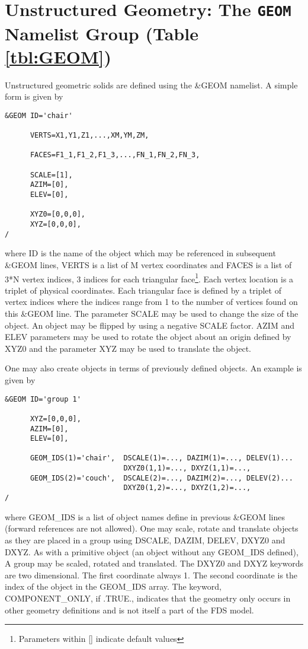 \documentclass[12pt]{article}
\begin{document}
\vspace{1.0in}
\section{Unstructured Geometry: The \texorpdfstring{{\tt GEOM}}{GEOM} Namelist Group (Table \ref{tbl:GEOM})}
\label{info:GEOM}

Unstructured geometric solids are defined using the \&GEOM namelist.
A simple form is given by

\begin{verbatim}
&GEOM ID='chair'

      VERTS=X1,Y1,Z1,...,XM,YM,ZM,

      FACES=F1_1,F1_2,F1_3,...,FN_1,FN_2,FN_3,

      SCALE=[1],
      AZIM=[0],
      ELEV=[0],

      XYZ0=[0,0,0],
      XYZ=[0,0,0],
/
\end{verbatim}

\noindent where ID is the name of the object which may be referenced in subsequent \&GEOM lines, VERTS is a list of M vertex coordinates and FACES is a list of 3*N vertex indices, 3 indices for each triangular face\footnote{Parameters within [] indicate default values}.  Each vertex location is a triplet of physical coordinates.  Each triangular face is defined by a triplet of vertex indices where the indices range from 1 to the number of vertices found on this \&GEOM line. The parameter SCALE may be used to change the size of the object. An object may be flipped by using a negative SCALE factor.  AZIM and ELEV parameters may be used to rotate the object about an origin defined by XYZ0 and the parameter XYZ may be used to translate the object.

One may also create objects in terms of previously defined objects.  An example is given by

{%
\begin{verbatim}
&GEOM ID='group 1'

      XYZ=[0,0,0],
      AZIM=[0],
      ELEV=[0],

      GEOM_IDS(1)='chair',  DSCALE(1)=..., DAZIM(1)=..., DELEV(1)...
                            DXYZ0(1,1)=..., DXYZ(1,1)=...,
      GEOM_IDS(2)='couch',  DSCALE(2)=..., DAZIM(2)=..., DELEV(2)...
                            DXYZ0(1,2)=..., DXYZ(1,2)=...,
/
\end{verbatim}
}

\noindent where GEOM\_IDS is a list of object names define in previous \&GEOM lines (forward references are not allowed).   One may scale, rotate and translate objects as they are placed in a group using DSCALE, DAZIM, DELEV, DXYZ0 and DXYZ.  As with a primitive object (an object without any GEOM\_IDS defined), A group may be scaled, rotated and translated. The DXYZ0 and DXYZ keywords are two dimensional.  The first coordinate always 1.  The second coordinate is the index of the object in the GEOM\_IDS array. The keyword, COMPONENT\_ONLY, if .TRUE., indicates that the geometry only occurs in other geometry definitions and is not itself a part of the FDS model.
\end{document}
